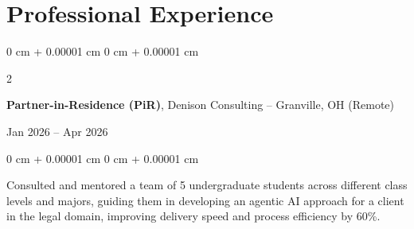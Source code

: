 \documentclass[10pt, letterpaper]{article}
\newenvironment{highlights}{
    \begin{itemize}[
        topsep=0.10 cm,
        parsep=0.10 cm,
        partopsep=0pt,
        itemsep=0pt,
        leftmargin=0 cm + 10pt
    ]
}{
    \end{itemize}
} %
\newenvironment{onecolentry}{
    \begin{adjustwidth}{
        0 cm + 0.00001 cm
    }{
        0 cm + 0.00001 cm
    }
}{
    \end{adjustwidth}
} %
\newenvironment{twocolentry}[2][]{
    \onecolentry
    \def\secondColumn{#2}
    \setcolumnwidth{\fill, 4.5 cm}
    \begin{paracol}{2}
}{
    \switchcolumn \raggedleft \secondColumn
    \end{paracol}
    \endonecolentry
} %
\begin{document}
    \section{Professional Experience}

        \begin{twocolentry}{
            Jan 2026 – Apr 2026
        }
            \textbf{Partner-in-Residence (PiR)}, Denison Consulting -- Granville, OH (Remote)
        \end{twocolentry}
        \vspace{0.10 cm}
        \begin{onecolentry}
            \begin{highlights}
                Consulted and mentored a team of 5 undergraduate students across different class levels and majors, guiding them in developing an agentic AI approach for a client in the legal domain, improving delivery speed and process efficiency by 60\%.
            \end{highlights}
        \end{onecolentry}

        \vspace{0.2 cm}
\end{document}
